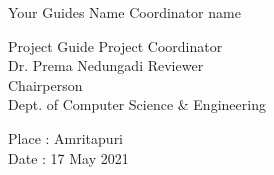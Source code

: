 \documentclass[oneside,12pt]{Classes/CUEDthesisPSnPDF}
\begin{document}
			


			

\vspace{20pt}

\begin{flushleft}
\vspace{5pt}
Your Guides Name \hspace{200pt} Coordinator name\\

\vspace{3pt}

Project Guide \hspace{232pt}Project Coordinator\\[10ex]

 

Dr. Prema Nedungadi  \hspace{185pt} Reviewer\\  Chairperson\\ Dept. of Computer Science \& Engineering \\[8ex]   
  

      

\end{flushleft}

\begin{flushleft}

\vspace{5pt}

Place	:	Amritapuri \\
Date	:	17 May 2021

\end{flushleft}



\pagebreak
\end{document}
